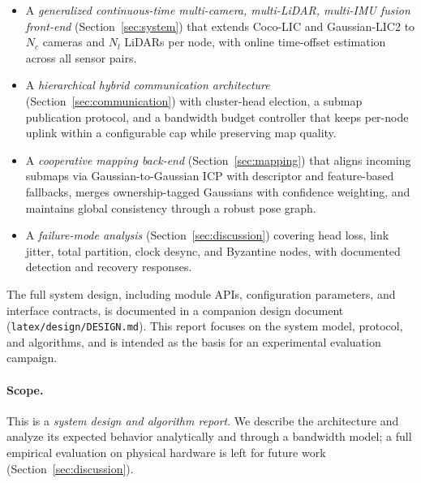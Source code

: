 \begin{itemize}
  \item A \emph{generalized continuous-time multi-camera, multi-LiDAR, multi-IMU
    fusion front-end} (Section~\ref{sec:system}) that extends Coco-LIC
    \cite{lang2023coco} and Gaussian-LIC2 to $N_c$ cameras and $N_l$ LiDARs per
    node, with online time-offset estimation across all sensor pairs.
  \item A \emph{hierarchical hybrid communication architecture}
    (Section~\ref{sec:communication}) with cluster-head election, a submap
    publication protocol, and a bandwidth budget controller that keeps per-node
    uplink within a configurable cap while preserving map quality.
  \item A \emph{cooperative mapping back-end} (Section~\ref{sec:mapping}) that
    aligns incoming submaps via Gaussian-to-Gaussian ICP with descriptor and
    feature-based fallbacks, merges ownership-tagged Gaussians with confidence
    weighting, and maintains global consistency through a robust pose graph.
  \item A \emph{failure-mode analysis} (Section~\ref{sec:discussion}) covering
    head loss, link jitter, total partition, clock desync, and Byzantine nodes,
    with documented detection and recovery responses.
\end{itemize}

The full system design, including module APIs, configuration parameters, and
interface contracts, is documented in a companion design document
(\texttt{latex/design/DESIGN.md}). This report focuses on the system model,
protocol, and algorithms, and is intended as the basis for an experimental
evaluation campaign.

\paragraph{Scope.} This is a \emph{system design and algorithm report}. We
describe the architecture and analyze its expected behavior analytically and
through a bandwidth model; a full empirical evaluation on physical hardware is
left for future work (Section~\ref{sec:discussion}).
